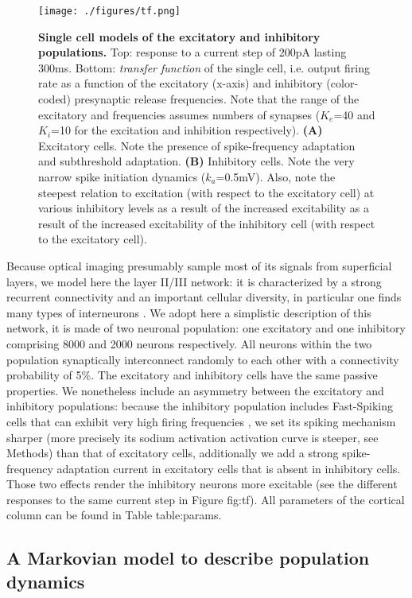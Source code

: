 \documentclass[8pt, colorlinks, a4paper]{article}
\renewcommand\ref{}
\begin{document}
\begin{figure*}
\centering
\texttt{[image: ./figures/tf.png]}
\caption{\label{fig:tf}\textbf{Single cell models of the excitatory and inhibitory populations.} Top: response to a current step of 200pA lasting 300ms. Bottom: \emph{transfer function} of the single cell, i.e. output firing rate as a function of the excitatory (x-axis) and inhibitory (color-coded) presynaptic release frequencies. Note that the range of the excitatory and frequencies assumes numbers of synapses (\(K_e\)=40 and \(K_i\)=10 for the excitation and inhibition respectively).  \textbf{(A)} Excitatory cells. Note the presence of spike-frequency adaptation and subthreshold adaptation. \textbf{(B)} Inhibitory cells. Note the very narrow spike initiation dynamics (\(k_a\)=0.5mV). Also, note the steepest relation to excitation (with respect to the excitatory cell) at various inhibitory levels as a result of the increased excitability as a result of the increased excitability of the inhibitory cell (with respect to the excitatory cell).}
\end{figure*}

Because optical imaging presumably sample most of its signals from
superficial layers, we model here the layer II/III network: it is
characterized by a strong recurrent connectivity and an important
cellular diversity, in particular one finds many types of interneurons
\cite{Markram2004,Ascoli2008a}. We adopt here a simplistic description
of this network, it is made of two neuronal population: one excitatory
and one inhibitory comprising 8000 and 2000 neurons respectively. All
neurons within the two population synaptically interconnect randomly
to each other with a connectivity probability of 5\%. The excitatory
and inhibitory cells have the same passive properties. We nonetheless
include an asymmetry between the excitatory and inhibitory
populations: because the inhibitory population includes Fast-Spiking
cells that can exhibit very high firing frequencies
\cite{Markram2004}, we set its spiking mechanism sharper (more
precisely its sodium activation activation curve is steeper, see
Methods) than that of excitatory cells, additionally we add a strong
spike-frequency adaptation current in excitatory cells that is absent
in inhibitory cells. Those two effects render the inhibitory neurons
more excitable (see the different responses to the same current step
in Figure \ref{fig:tf}). All parameters of the cortical column can be
found in Table \ref{table:params}.

\subsection{A Markovian model to describe population dynamics}
\label{sec-4-2}
\end{document}
